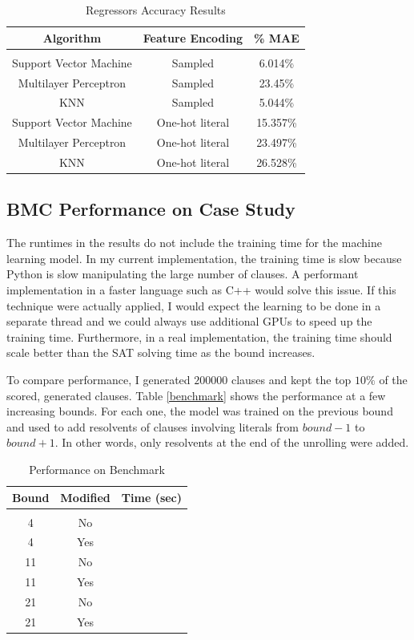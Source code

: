 \documentclass[letterpaper]{article} %
\begin{document}
\begin{table}[h!]
\centering
\begin{tabular}{ c | c | c }
Algorithm & Feature Encoding & \% MAE \\
\hline \\
Support Vector Machine & Sampled & 6.014\% \\
Multilayer Perceptron & Sampled & 23.45\% \\
KNN & Sampled & 5.044\% \\ 
Support Vector Machine & One-hot literal & 15.357\% \\
Multilayer Perceptron & One-hot literal & 23.497\% \\
KNN & One-hot literal & 26.528\% 
\end{tabular}
\caption{Regressors Accuracy Results}
\label{acc-reg}
\end{table}

\subsection{BMC Performance on Case Study}

The runtimes in the results do not include the training time for the machine learning model. In my current implementation, the training time is slow because Python is slow manipulating the large number of clauses. A performant implementation in a faster language such as C++ would solve this issue. If this technique were actually applied, I would expect the learning to be done in a separate thread and we could always use additional GPUs to speed up the training time. Furthermore, in a real implementation, the training time should scale better than the SAT solving time as the bound increases.

To compare performance, I generated $200000$ clauses and kept the top $10\%$ of the scored, generated clauses. Table \ref{benchmark} shows the performance at a few increasing bounds. For each one, the model was trained on the previous bound and used to add resolvents of clauses involving literals from $bound-1$ to $bound+1$. In other words, only resolvents at the end of the unrolling were added.

\begin{table}[h!]
\centering
\begin{tabular}{ c | c | c }
Bound & Modified & Time (sec) \\
\hline \\
4 & No & \\
4 & Yes & \\
11 & No & \\
11 & Yes & \\
21 & No & \\
21 & Yes & \\
\end{tabular}
\caption{Performance on Benchmark}
\label{acc-reg}
\end{table}
\end{document}
